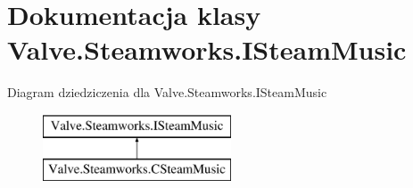 \hypertarget{class_valve_1_1_steamworks_1_1_i_steam_music}{}\section{Dokumentacja klasy Valve.\+Steamworks.\+I\+Steam\+Music}
\label{class_valve_1_1_steamworks_1_1_i_steam_music}
Diagram dziedziczenia dla Valve.\+Steamworks.\+I\+Steam\+Music\begin{figure}[H]
\begin{center}
\leavevmode
\includegraphics[height=2.000000cm]{class_valve_1_1_steamworks_1_1_i_steam_music}
\end{center}
\end{figure}
